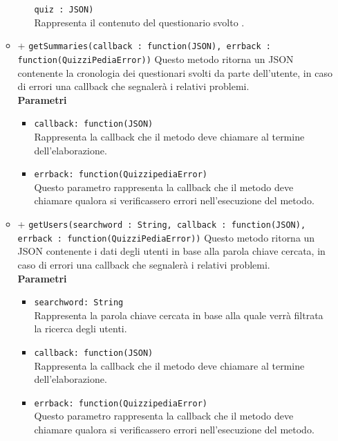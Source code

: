 \begin{itemize}
\begin{itemize}
\begin{itemize}
				\texttt{quiz : JSON)} \\
				Rappresenta il contenuto del questionario svolto .		
			\end{itemize}
		\item	
		+ \texttt{getSummaries(callback : function(JSON), errback : function(QuizziPediaError))}	
		Questo metodo ritorna un JSON contenente la cronologia dei questionari svolti da parte dell'utente, in caso di errori una callback che segnalerà i relativi problemi.\\
		\textbf{Parametri} 
			\begin{itemize}
			\item	
				\texttt{callback: function(JSON)} \\
				Rappresenta la callback che il metodo deve chiamare al termine dell'elaborazione.	
			\item	
				\texttt{errback: function(QuizzipediaError)} \\
				Questo parametro rappresenta la callback che il metodo deve chiamare qualora si verificassero errori nell'esecuzione del metodo.
			\end{itemize}	
		\item			
		+ \texttt{getUsers(searchword : String, callback : function(JSON), errback : function(QuizziPediaError))}		
		Questo metodo ritorna un JSON contenente i dati degli utenti in base alla parola chiave cercata, in caso di errori una callback che segnalerà i relativi problemi.\\
		\textbf{Parametri} 
			\begin{itemize}
			\item	
				\texttt{searchword: String} \\
				Rappresenta la parola chiave cercata in base alla quale verrà filtrata la ricerca degli utenti.	
			\item	
				\texttt{callback: function(JSON)} \\
				Rappresenta la callback che il metodo deve chiamare al termine dell'elaborazione.	
			\item	
				\texttt{errback: function(QuizzipediaError)} \\
				Questo parametro rappresenta la callback che il metodo deve chiamare qualora si verificassero errori nell'esecuzione del metodo.		
			\end{itemize}
		\end{itemize}	
\end{itemize}